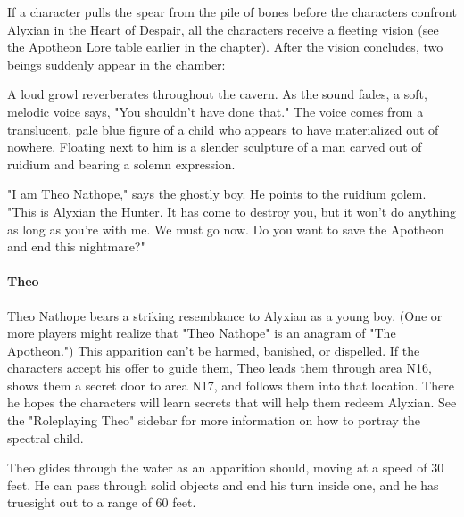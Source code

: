 \documentclass[10pt,a4paper,twoside,bg=print,twocolumn,openany,nodeprecatedcode]{dndbook}
\begin{document}
If a character pulls the spear from the pile of bones before the characters confront Alyxian in the Heart of Despair, all the characters receive a fleeting vision (see the Apotheon Lore table earlier in the chapter). After the vision concludes, two beings suddenly appear in the chamber:

\begin{DndReadAloud}{}
A loud growl reverberates throughout the cavern. As the sound fades, a soft, melodic voice says, "You shouldn't have done that." The voice comes from a translucent, pale blue figure of a child who appears to have materialized out of nowhere. Floating next to him is a slender sculpture of a man carved out of ruidium and bearing a solemn expression.

"I am Theo Nathope," says the ghostly boy. He points to the ruidium golem. "This is Alyxian the Hunter. It has come to destroy you, but it won't do anything as long as you're with me. We must go now. Do you want to save the Apotheon and end this nightmare?"

\end{DndReadAloud}

\paragraph{Theo}
Theo Nathope bears a striking resemblance to Alyxian as a young boy. (One or more players might realize that "Theo Nathope" is an anagram of "The Apotheon.") This apparition can't be harmed, banished, or dispelled. If the characters accept his offer to guide them, Theo leads them through area N16, shows them a secret door to area N17, and follows them into that location. There he hopes the characters will learn secrets that will help them redeem Alyxian. See the "Roleplaying Theo" sidebar for more information on how to portray the spectral child.

Theo glides through the water as an apparition should, moving at a speed of 30 feet. He can pass through solid objects and end his turn inside one, and he has truesight out to a range of 60 feet.
\end{document}
